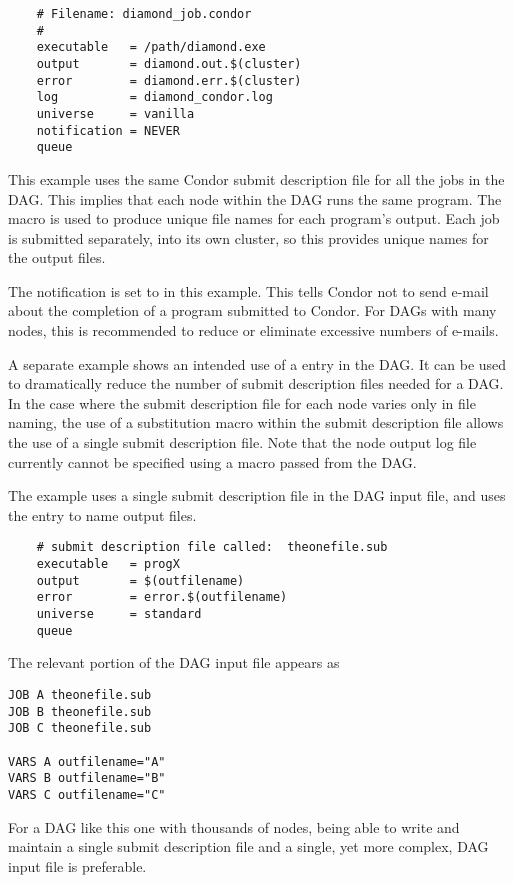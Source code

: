 \begin{verbatim}
	# Filename: diamond_job.condor
	#
	executable   = /path/diamond.exe
	output       = diamond.out.$(cluster)
	error        = diamond.err.$(cluster)
	log          = diamond_condor.log
	universe     = vanilla
	notification = NEVER
	queue
\end{verbatim}

This example uses the same Condor submit description file
for all the jobs in the DAG.
This implies that each node within the DAG runs the
same program.
The  macro
is used to produce unique file names for each program's output.
Each job is submitted separately, into its own cluster,
so this provides unique names for the output files.

The notification is set to \verb@NEVER@ in this example.
This tells Condor not to send e-mail about the completion of a program
submitted to Condor.
For DAGs with many nodes, this is recommended
to reduce or eliminate excessive numbers of e-mails.

A separate example shows an intended use of a  entry
in the DAG.
It can be used to dramatically reduce the number of submit description
files needed for a DAG.
In the case where the submit description file for each node
varies only in file naming, the use of a substitution macro
within the submit description file allows the use of 
a single submit description file.
Note that the node output log file currently cannot be
specified using a macro passed from the DAG.

The example uses a single submit description file in the DAG input
file, and uses the  entry to name output files.

\begin{verbatim}
	# submit description file called:  theonefile.sub
	executable   = progX
	output       = $(outfilename)
	error        = error.$(outfilename)
	universe     = standard
	queue
\end{verbatim}

The relevant portion of the DAG input file appears as 
\begin{verbatim}
JOB A theonefile.sub
JOB B theonefile.sub
JOB C theonefile.sub

VARS A outfilename="A"
VARS B outfilename="B"
VARS C outfilename="C"
\end{verbatim}

For a DAG like this one with thousands of nodes,
being able to write and maintain a single submit description file 
and a single, yet more complex, DAG input file is preferable.

